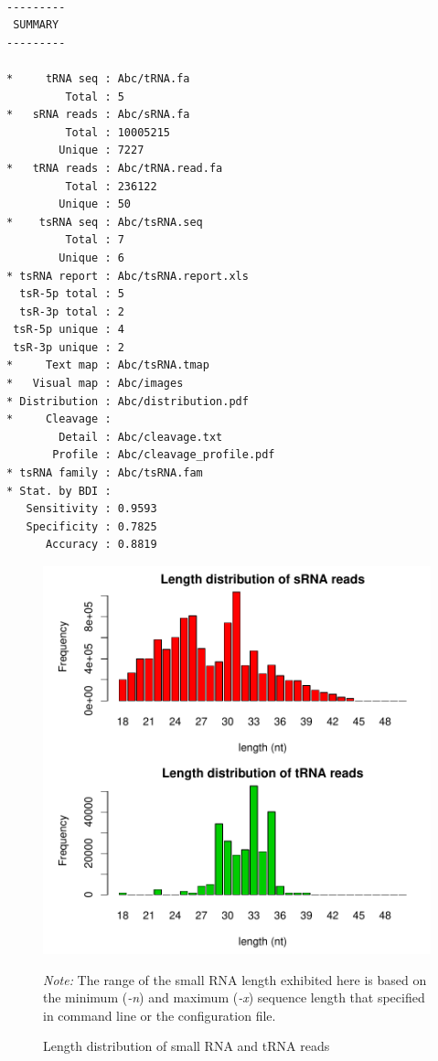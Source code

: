 \documentclass[11pt, a4paper]{article}
\begin{document}
{\footnotesize \begin{tcolorbox}[colback=blue!5!white,colframe=blue!75!black,title=tsRFinder demo output list]
\begin{verbatim}

---------
 SUMMARY 
---------

*     tRNA seq : Abc/tRNA.fa
         Total : 5
*   sRNA reads : Abc/sRNA.fa
         Total : 10005215
        Unique : 7227
*   tRNA reads : Abc/tRNA.read.fa
         Total : 236122
        Unique : 50
*    tsRNA seq : Abc/tsRNA.seq
         Total : 7
        Unique : 6
* tsRNA report : Abc/tsRNA.report.xls
  tsR-5p total : 5
  tsR-3p total : 2
 tsR-5p unique : 4
 tsR-3p unique : 2
*     Text map : Abc/tsRNA.tmap
*   Visual map : Abc/images
* Distribution : Abc/distribution.pdf
*     Cleavage :
        Detail : Abc/cleavage.txt
       Profile : Abc/cleavage_profile.pdf
* tsRNA family : Abc/tsRNA.fam
* Stat. by BDI :
   Sensitivity : 0.9593
   Specificity : 0.7825
      Accuracy : 0.8819

\end{verbatim}
\end{tcolorbox}}

\begin{figure}[htbp]
\begin{center}
\includegraphics[width=13cm]{distribution.pdf}
\caption{Length distribution of small RNA and tRNA reads}
\label{distribution}
\end{center}
\emph{Note:} The range of the small RNA length exhibited here is based on the minimum (\emph{-n}) and maximum (\emph{-x}) sequence length that specified in command line or the configuration file.
\end{figure}
\end{document}
